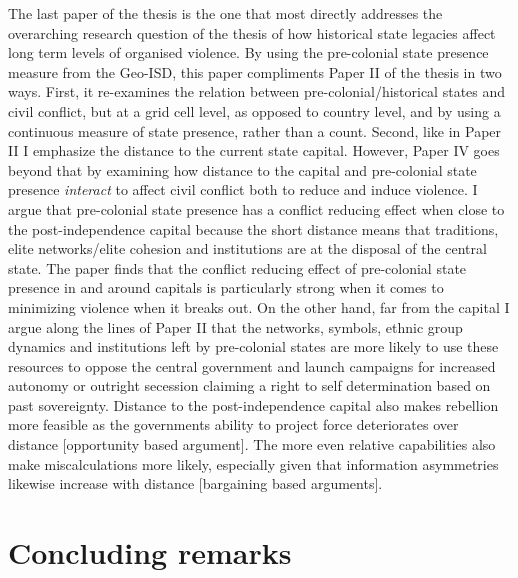The last paper of the thesis is the one that most directly addresses the
overarching research question of the thesis of how historical state legacies
affect long term levels of organised violence. By using the pre-colonial state
presence measure from the Geo-ISD, this paper compliments Paper II of the thesis
in two ways. First, it re-examines the relation between pre-colonial/historical
states and civil conflict, but at a grid cell level, as opposed to country
level, and by using a continuous measure of state presence, rather than a count.
Second, like in Paper II I emphasize the distance to the current state capital.
However, Paper IV goes beyond that by examining how distance to the capital and
pre-colonial state presence \textit{interact} to affect civil conflict both to
reduce and induce violence. I argue that pre-colonial state presence has a
conflict reducing effect when close to the post-independence capital because the
short distance means that traditions, elite networks/elite cohesion and
institutions are at the disposal of the central state. The paper finds that the
conflict reducing effect of pre-colonial state presence in and around capitals
is particularly strong when it comes to minimizing violence when it breaks out.
On the other hand, far from the capital I argue along the lines of Paper II that
the networks, symbols, ethnic group dynamics and institutions left by
pre-colonial states are more likely to use these resources to oppose the central
government and launch campaigns for increased autonomy or outright secession
claiming a right to self determination based on past sovereignty. Distance to
the post-independence capital also makes rebellion more feasible as the
governments ability to project force deteriorates over distance [opportunity
based argument]. The more even relative capabilities also make miscalculations
more likely, especially given that information asymmetries likewise increase
with distance [bargaining based arguments].

\section{Concluding remarks} \label{Concluding remarks}

